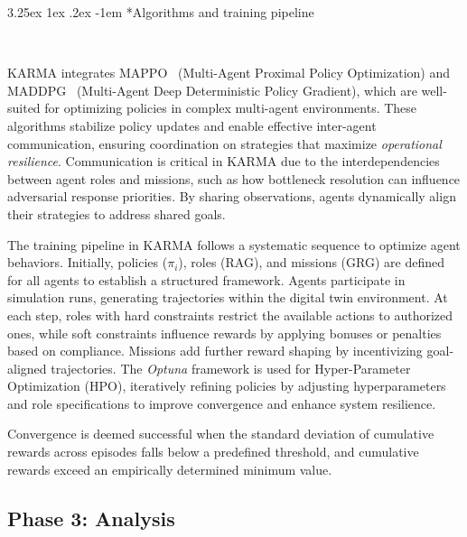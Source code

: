 \documentclass[conference]{IEEEtran}
\makeatletter
\renewcommand\paragraph{\@startsection{paragraph}{5}{\z@}%
  {3.25ex \@plus1ex \@minus.2ex}%
  {-1em}%
  {\normalfont\normalsize\bfseries}}
\makeatother
\begin{document}
\paragraph*{Algorithms and training pipeline}

\

KARMA integrates MAPPO~\cite{yu2021mappo} (Multi-Agent Proximal Policy Optimization) and MADDPG~\cite{lowe2017multi} (Multi-Agent Deep Deterministic Policy Gradient), which are well-suited for optimizing policies in complex multi-agent environments. These algorithms stabilize policy updates and enable effective inter-agent communication, ensuring coordination on strategies that maximize \textit{operational resilience}. Communication is critical in KARMA due to the interdependencies between agent roles and missions, such as how bottleneck resolution can influence adversarial response priorities. By sharing observations, agents dynamically align their strategies to address shared goals.

The training pipeline in KARMA follows a systematic sequence to optimize agent behaviors. Initially, policies (\(\pi_i\)), roles (RAG), and missions (GRG) are defined for all agents to establish a structured framework. Agents participate in simulation runs, generating trajectories within the digital twin environment. At each step, roles with hard constraints restrict the available actions to authorized ones, while soft constraints influence rewards by applying bonuses or penalties based on compliance. Missions add further reward shaping by incentivizing goal-aligned trajectories. The \textit{Optuna} framework is used for Hyper-Parameter Optimization (HPO), iteratively refining policies by adjusting hyperparameters and role specifications to improve convergence and enhance system resilience.

Convergence is deemed successful when the standard deviation of cumulative rewards across episodes falls below a predefined threshold, and cumulative rewards exceed an empirically determined minimum value.


\subsection{Phase 3: Analysis}
\label{sec:analysis}
\end{document}
